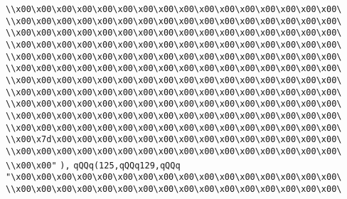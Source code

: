 \verb|\\x00\x00\x00\x00\x00\x00\x00\x00\x00\x00\x00\x00\x00\x00\x00\x00\|\newline
\verb|\\x00\x00\x00\x00\x00\x00\x00\x00\x00\x00\x00\x00\x00\x00\x00\x00\|\newline
\verb|\\x00\x00\x00\x00\x00\x00\x00\x00\x00\x00\x00\x00\x00\x00\x00\x00\|\newline
\verb|\\x00\x00\x00\x00\x00\x00\x00\x00\x00\x00\x00\x00\x00\x00\x00\x00\|\newline
\verb|\\x00\x00\x00\x00\x00\x00\x00\x00\x00\x00\x00\x00\x00\x00\x00\x00\|\newline
\verb|\\x00\x00\x00\x00\x00\x00\x00\x00\x00\x00\x00\x00\x00\x00\x00\x00\|\newline
\verb|\\x00\x00\x00\x00\x00\x00\x00\x00\x00\x00\x00\x00\x00\x00\x00\x00\|\newline
\verb|\\x00\x00\x00\x00\x00\x00\x00\x00\x00\x00\x00\x00\x00\x00\x00\x00\|\newline
\verb|\\x00\x00\x00\x00\x00\x00\x00\x00\x00\x00\x00\x00\x00\x00\x00\x00\|\newline
\verb|\\x00\x00\x00\x00\x00\x00\x00\x00\x00\x00\x00\x00\x00\x00\x00\x00\|\newline
\verb|\\x00\x00\x00\x00\x00\x00\x00\x00\x00\x00\x00\x00\x00\x00\x00\x00\|\newline
\verb|\\x00\x7d\x00\x00\x00\x00\x00\x00\x00\x00\x00\x00\x00\x00\x00\x00\|\newline
\verb|\\x00\x00\x00\x00\x00\x00\x00\x00\x00\x00\x00\x00\x00\x00\x00\x00\|\newline
\verb|\\x00\x00"|\newline
\verb|),|\newline
\verb|qQQq(125,qQQq129,qQQq|\newline
\verb|"\x00\x00\x00\x00\x00\x00\x00\x00\x00\x00\x00\x00\x00\x00\x00\x00\|\newline
\verb|\\x00\x00\x00\x00\x00\x00\x00\x00\x00\x00\x00\x00\x00\x00\x00\x00\|\newline
